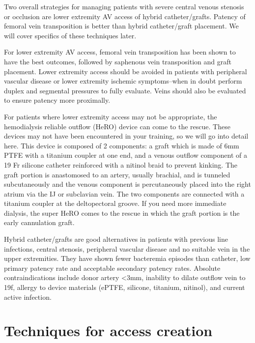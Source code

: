 \documentclass[
]{book}
\begin{document}
Two overall strategies for managing patients with severe central venous
stenosis or occlusion are lower extremity AV access of hybrid
catheter/grafts. Patency of femoral vein transposition is better than
hybrid catheter/graft placement.\citep{brownie2016, glickman2011} We will
cover specifics of these techniques later.

For lower extremity AV access, femoral vein transposition has been shown
to have the best outcomes, followed by saphenous vein transposition and
graft placement. Lower extremity access should be avoided in patients
with peripheral vascular disease or lower extremity ischemic
symptoms--when in doubt perform duplex and segmental pressures to fully
evaluate. Veins should also be evaluated to ensure patency more
proximally.\citep{parekh2016}

For patients where lower extremity access may not be appropriate, the
hemodialysis reliable outflow (HeRO) device can come to the rescue.
These devices may not have been encountered in your training, so we will
go into detail here. This device is composed of 2 components: a graft
which is made of 6mm PTFE with a titanium coupler at one end, and a
venous outflow component of a 19 Fr silicone catheter reinforced with a
nitinol braid to prevent kinking. The graft portion is anastomosed to an
artery, usually brachial, and is tunneled subcutaneously and the venous
component is percutaneously placed into the right atrium via the IJ or
subclavian vein. The two components are connected with a titanium
coupler at the deltopectoral groove. If you need more immediate
dialysis, the super HeRO comes to the rescue in which the graft portion
is the early cannulation graft.

Hybrid catheter/grafts are good alternatives in patients with previous
line infections, central stenosis, peripheral vascular disease and no
suitable vein in the upper extremities. They have shown fewer bacteremia
episodes than catheter, low primary patency rate and acceptable
secondary patency rates.\citep{alshakarchi2015} Absolute contraindications
include donor artery \textless3mm, inability to dilate outflow vein to 19f,
allergy to device materials (ePTFE, silicone, titanium, nitinol), and
current active infection.\citep{meritmedical}

\hypertarget{techniques-for-access-creation}{%
\section{Techniques for access creation}\label{techniques-for-access-creation}}
\end{document}
